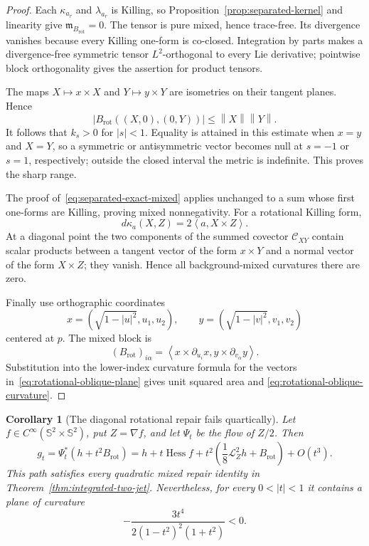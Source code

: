 \documentclass[11pt]{amsart}
\newtheorem{corollary}[theorem]{Corollary}
\theoremstyle{definition}
\theoremstyle{remark}
\DeclareMathOperator{\Hess}{Hess}
\newcommand{\Sph}{\mathbb S}
\newcommand{\ip}[2]{\left\langle #1,#2\right\rangle}
\newcommand{\norm}[1]{\left\lVert #1\right\rVert}
\begin{document}
\begin{proof}
Each $\kappa_{a_r}$ and $\lambda_{a_r}$ is Killing, so
Proposition~\ref{prop:separated-kernel} and linearity give
$\mathfrak m_{B_{\mathrm{rot}}}=0$.  The tensor is pure mixed, hence
trace-free.  Its divergence vanishes because every Killing one-form is
co-closed.  Integration by parts makes a divergence-free symmetric
tensor $L^2$-orthogonal to every Lie derivative; pointwise block
orthogonality gives the assertion for product tensors.

The maps $X\mapsto x\times X$ and $Y\mapsto y\times Y$ are isometries
on their tangent planes.  Hence
\[
 |B_{\mathrm{rot}}((X,0),(0,Y))|
 \leq\norm{X}\norm{Y}.
\]
It follows that $k_s>0$ for $|s|<1$.  Equality is attained in this
estimate when $x=y$ and $X=Y$, so a symmetric or antisymmetric vector
becomes null at $s=-1$ or $s=1$, respectively; outside the closed
interval the metric is indefinite.  This proves the sharp range.

The proof of~\eqref{eq:separated-exact-mixed} applies unchanged to a
sum whose first one-forms are Killing, proving mixed nonnegativity.
For a rotational Killing form,
\[
 d\kappa_a(X,Z)=2\ip{a}{X\times Z}.
\]
At a diagonal point the two components of the summed covector
$\mathcal C_{XY}$ contain scalar products between a tangent vector of
the form $x\times Y$ and a normal vector of the form $X\times Z$;
they vanish.  Hence all background-mixed curvatures there are zero.

Finally use orthographic coordinates
\[
 x=(\sqrt{1-|u|^2},u_1,u_2),
 \qquad
 y=(\sqrt{1-|v|^2},v_1,v_2)
\]
centered at $p$.  The mixed block is
\[
 (B_{\mathrm{rot}})_{i\alpha}
 =\ip{x\times\partial_{u_i}x}
       {y\times\partial_{v_\alpha}y}.
\]
Substitution into the lower-index curvature formula for the vectors
in~\eqref{eq:rotational-oblique-plane} gives unit squared area and
\eqref{eq:rotational-oblique-curvature}.
\end{proof}

\begin{corollary}[The diagonal rotational repair fails quartically]
\label{cor:rotational-repair}
Let $f\in C^\infty(\Sph^2\times\Sph^2)$, put $Z=\nabla f$, and let
$\Psi_t$ be the flow of $Z/2$.  Then
\begin{equation}\label{eq:rotational-corrected-path}
 g_t=\Psi_t^*(h+t^2B_{\mathrm{rot}})
 =h+t\Hess f+t^2
  \left(\frac18\mathcal L_Z^2h+B_{\mathrm{rot}}\right)+O(t^3).
\end{equation}
This path satisfies every quadratic mixed repair identity in
Theorem~\ref{thm:integrated-two-jet}.  Nevertheless, for every
$0<|t|<1$ it contains a plane of curvature
\begin{equation}\label{eq:rotational-quartic-obstruction}
 -\frac{3t^4}{2(1-t^2)^2(1+t^2)}<0.
\end{equation}
\end{corollary}
\end{document}

